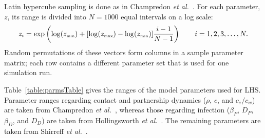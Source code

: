 \documentclass[10pt,letterpaper]{article}
\newcommand{\etal}{\textit{et al.}}
\newcommand{\tsub}[2]{#1_{{\textrm{\tiny #2}}}}
\begin{document}
Latin hypercube sampling is done as in Champredon \etal\ \cite{champredon_hiv_2013}. For each parameter, $z$, its range is divided into $N = 1000$ equal intervals on a log scale:
\begin{equation}
z_i = \exp\left(\log(\tsub{z}{min}) + [\log(\tsub{z}{max}) - \log(\tsub{z}{min})] \frac{i-1}{N-1}\right) \qquad i = 1, 2, 3, \dots,N.
\end{equation}
Random permutations of these vectors form columns in a sample parameter matrix; each row contains a different parameter set that is used for one simulation run.

Table~\ref{table:parmsTable} gives the ranges of the model parameters used for LHS. Parameter ranges regarding contact and partnership dynamics ($\rho$, $c$, and $c_e/c_w$) are taken from Champredon \etal\ \cite{champredon_hiv_2013}, whereas those regarding infection ($\beta_P$, $D_P$, $\beta_D$, and $D_D$) are taken from Hollingsworth \etal\ \cite{hollingsworth_hiv1_2008}. The remaining parameters are taken from Shirreff \etal\ \cite{shirreff_transmission_2011}.

\end{document}
